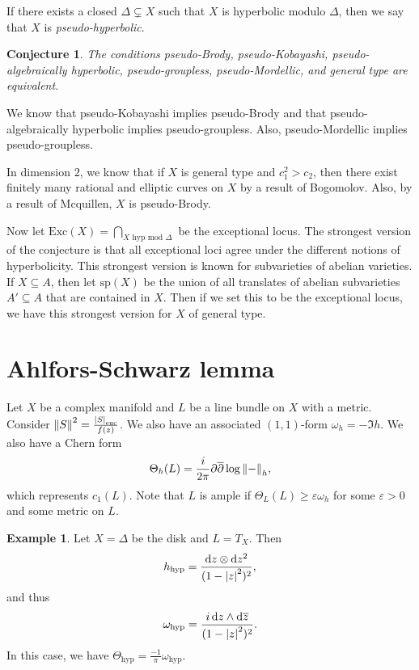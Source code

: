\documentclass[leqno, openany]{memoir}
\newtheorem{conj}[thm]{Conjecture}
\theoremstyle{definition}
\newtheorem{exm}[thm]{Example}
\theoremstyle{remark}
\theoremstyle{plain}
\theoremstyle{definition}
\theoremstyle{remark}
\newcommand{\ep}{\varepsilon}
\newcommand{\mr}[1]{\mathrm{#1}}
\newcommand{\ol}[1]{\overline{#1}}
\begin{document}
If there exists a closed $\Delta \subsetneq X$ such that $X$ is hyperbolic modulo $\Delta$, then we say that $X$ is \textit{pseudo-hyperbolic}.

\begin{conj}
    The conditions pseudo-Brody, pseudo-Kobayashi, pseudo-algebraically hyperbolic, pseudo-groupless, pseudo-Mordellic, and general type are equivalent.
\end{conj}

We know that pseudo-Kobayashi implies pseudo-Brody and that pseudo-algebraically hyperbolic implies pseudo-groupless. Also, pseudo-Mordellic implies pseudo-groupless.

In dimension $2$, we know that if $X$ is general type and $c_1^2 > c_2$, then there exist finitely many rational and elliptic curves on $X$ by a result of Bogomolov. Also, by a result of Mcquillen, $X$ is pseudo-Brody.

Now let $\mr{Exc}(X) = \bigcap_{X \text{ hyp mod }\Delta}$ be the exceptional locus. The strongest version of the conjecture is that all exceptional loci agree under the different notions of hyperbolicity. This strongest version is known for subvarieties of abelian varieties. If $X \subseteq A$, then let $\mr{sp}(X)$ be the union of all translates of abelian subvarieties $A' \subseteq A$ that are contained in $X$. Then if we set this to be the exceptional locus, we have this strongest version for $X$ of general type.

\section{Ahlfors-Schwarz lemma}

Let $X$ be a complex manifold and $L$ be a line bundle on $X$ with a metric. Consider $\norm{S}^2 = \frac{\abs{S}_{\mr{euc}}}{f(z)}$. We also have an associated $(1,1)$-form $\omega_h = - \Im h$. We also have a Chern form 
\[ \Theta_h(L) = \frac{i}{2 \pi} \partial \ol{\partial} \log \norm{-}_h, \]
which represents $c_1(L)$. Note that $L$ is ample if $\Theta_L(L) \geq \ep \omega_h$ for some $\ep > 0$ and some metric on $L$.

\begin{exm}
    Let $X = \Delta$ be the disk and $L = T_X$. Then
    \[ h_{\mr{hyp}} = \frac{\dd{z} \otimes \dd{z^2}}{(1-\abs{z}^2)^2}, \]
    and thus
    \[ \omega_{\mr{hyp}} = \frac{i \dd{z} \wedge \dd{\ol{z}}}{(1-\abs{z}^2)^2}. \]
    In this case, we have $\Theta_{\mr{hyp}} = \frac{-1}{\pi} \omega_{\mr{hyp}}$.
\end{exm}
\end{document}
